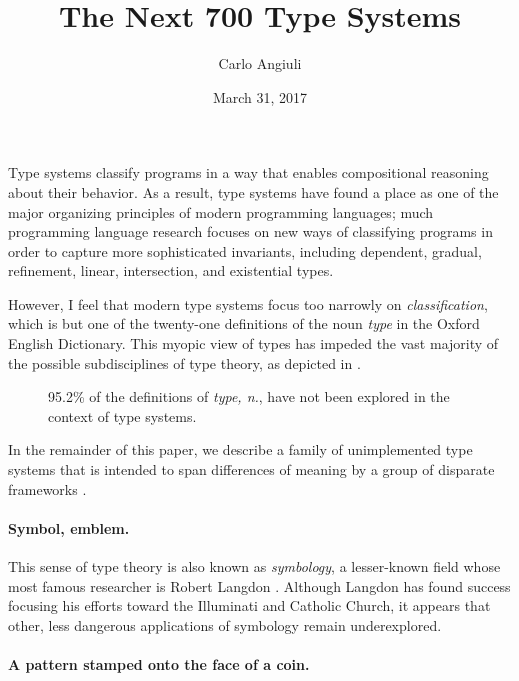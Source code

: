 \documentclass[10pt]{article}
\title{The Next 700 Type Systems}
\author{Carlo Angiuli}
\date{March 31, 2017}
\newcommand{\slice}[3]{
  \draw[thick,fill=#3] (0,0) -- (#1:1) arc (#1:#2:1) -- cycle;
}
\begin{document}
\maketitle

Type systems classify programs in a way that enables compositional reasoning
about their behavior. As a result, type systems have found a place as one of the
major organizing principles of modern programming languages; much programming
language research focuses on new ways of classifying programs in order to
capture more sophisticated invariants, including dependent, gradual, refinement,
linear, intersection, and existential types.

However, I feel that modern type systems focus too narrowly on
\emph{classification}, which is but one of the twenty-one definitions of the
noun \emph{type} in the Oxford English Dictionary. This myopic view of types has
impeded the vast majority of the possible subdisciplines of type theory, as
depicted in .

\begin{figure}[hb]
\centering
{}
\caption{95.2\% of the definitions of \emph{type, n.}, have not been explored in
the context of type systems.}
\label{fig:pie-chart}
\end{figure}

In the remainder of this paper, we describe a family of unimplemented type
systems that is intended to span differences of meaning by a group of disparate
frameworks \citep{landin66}.

\paragraph{Symbol, emblem.}

This sense of type theory is also known as \emph{symbology}, a lesser-known
field whose most famous researcher is Robert Langdon \citep{brown00}. Although
Langdon has found success focusing his efforts toward the Illuminati and
Catholic Church, it appears that other, less dangerous applications of symbology
remain underexplored.

\paragraph{A pattern stamped onto the face of a coin.}
\end{document}
